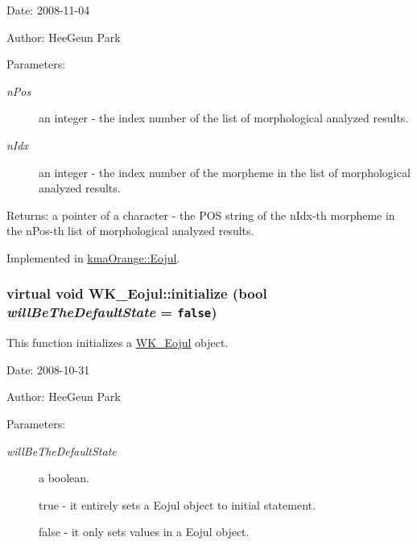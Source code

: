 \begin{Desc}
\item[Date:]2008-11-04 \end{Desc}
\begin{Desc}
\item[Author:]HeeGeun Park \end{Desc}
\begin{Desc}
\item[Parameters:]
\begin{description}
\item[{\em nPos}]an integer - the index number of the list of morphological analyzed results. \item[{\em nIdx}]an integer - the index number of the morpheme in the list of morphological analyzed results. \end{description}
\end{Desc}
\begin{Desc}
\item[Returns:]a pointer of a character - the POS string of the nIdx-th morpheme in the nPos-th list of morphological analyzed results. \end{Desc}


Implemented in \hyperlink{classkmaOrange_1_1Eojul_c69fdea5b0394919a4eb95726c1d6cea}{kmaOrange::Eojul}.\hypertarget{classWK__Eojul_0a47e3d87115a85868ed5b3cfecc6787}{
\subsubsection[{initialize}]{\setlength{\rightskip}{0pt plus 5cm}virtual void WK\_\-Eojul::initialize (bool {\em willBeTheDefaultState} = {\tt false})}}
\label{classWK__Eojul_0a47e3d87115a85868ed5b3cfecc6787}


This function initializes a \hyperlink{classWK__Eojul}{WK\_\-Eojul} object. 

\begin{Desc}
\item[Date:]2008-10-31 \end{Desc}
\begin{Desc}
\item[Author:]HeeGeun Park \end{Desc}
\begin{Desc}
\item[Parameters:]
\begin{description}
\item[{\em willBeTheDefaultState}]a boolean. \par
 true - it entirely sets a Eojul object to initial statement. \par
 false - it only sets values in a Eojul object. \end{description}
\end{Desc}


